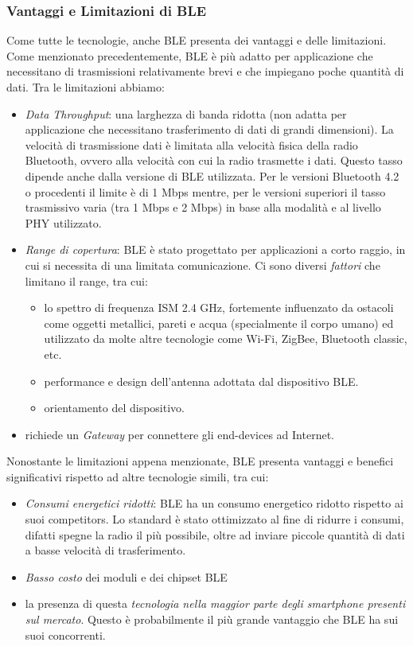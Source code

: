 \subsubsection{Vantaggi e Limitazioni di BLE}
Come tutte le tecnologie, anche BLE presenta dei vantaggi e delle limitazioni. Come menzionato precedentemente, BLE è più adatto per applicazione che necessitano di trasmissioni relativamente brevi e che impiegano poche quantità di dati. Tra le limitazioni abbiamo:
\begin{itemize}
    \item \textit{Data Throughput}: una larghezza di banda ridotta (non adatta per applicazione che necessitano trasferimento di dati di grandi dimensioni). La velocità di trasmissione dati è limitata alla velocità fisica della radio Bluetooth, ovvero alla velocità con cui la radio trasmette i dati. Questo tasso dipende anche dalla versione di BLE utilizzata. Per le versioni Bluetooth 4.2 o procedenti il limite è di 1 Mbps mentre, per le versioni superiori il tasso trasmissivo varia (tra 1 Mbps e 2 Mbps) in base alla modalità e al livello PHY utilizzato.
    
    \item \textit{Range di copertura}: BLE è stato progettato per applicazioni a corto raggio, in cui si necessita di una limitata comunicazione. Ci sono diversi \textit{fattori} che limitano il range, tra cui: 
    \begin{itemize}
        \item lo spettro di frequenza ISM 2.4 GHz, fortemente influenzato da ostacoli come oggetti metallici, pareti e acqua (specialmente il corpo umano) ed utilizzato da molte altre tecnologie come Wi-Fi, ZigBee, Bluetooth classic, etc.
        \item performance e design dell'antenna adottata dal dispositivo BLE.
        \item orientamento del dispositivo.
    \end{itemize}
    
    \item richiede un \textit{Gateway} per connettere gli end-devices ad Internet.
\end{itemize}

\noindent Nonostante le limitazioni appena menzionate, BLE presenta vantaggi e benefici significativi rispetto ad altre tecnologie simili, tra cui:
\begin{itemize}
    \item \textit{Consumi energetici ridotti}: BLE ha un consumo energetico ridotto rispetto ai suoi competitors. Lo standard è stato ottimizzato al fine di ridurre i consumi, difatti spegne la radio il più possibile, oltre ad inviare piccole quantità di dati a basse velocità di trasferimento.
    \item \textit{Basso costo} dei moduli e dei chipset BLE
    \item la presenza di questa \textit{tecnologia nella maggior parte degli smartphone presenti sul mercato}. Questo è probabilmente il più grande vantaggio che BLE ha sui suoi concorrenti.
\end{itemize}

